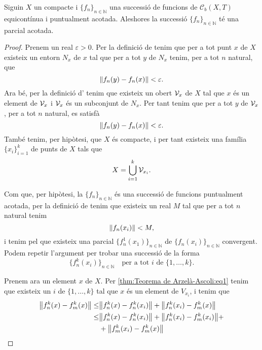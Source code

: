 \documentclass[../Apunts.tex]{subfiles}
\begin{document}
	\begin{theorem}
		\label{thm:Teorema de Arzelà-Ascoli}
		Siguin \(X\) un compacte i \(\{f_{n}\}_{n\in\mathbb{N}}\) una successió de funcions de \(\mathcal{C}_{b}(X,T)\) equicontínua i puntualment acotada. Aleshores la successió \(\{f_{n}\}_{n\in\mathbb{N}}\) té una parcial acotada.
		\begin{proof}
			Prenem un real \(\varepsilon>0\). Per la definició de  tenim que per a tot punt \(x\) de \(X\) existeix un entorn \(N_{x}\) de \(x\) tal que per a tot \(y\) de \(N_{x}\) tenim, per a tot \(n\) natural, que
			\[\norm{f_{n}(y)-f_{n}(x)}<\varepsilon.\]
			Ara bé, per la definició d' tenim que existeix un obert \(\mathcal{V}_{x}\) de \(X\) tal que \(x\) és un element de \(\mathcal{V}_{x}\) i \(\mathcal{V}_{x}\) és un subconjunt de \(N_{x}\). Per tant tenim que per a tot \(y\) de \(\mathcal{V}_{x}\), per a tot \(n\) natural, es satisfà
			\[\norm{f_{n}(y)-f_{n}(x)}<\varepsilon.\]
			També tenim, per hipòtesi, que \(X\) és compacte, i per tant existeix una família \(\{x_{i}\}_{i=1}^{k}\) de punts de \(X\) tals que
			\begin{equation}
				\label{thm:Teorema de Arzelà-Ascoli:eq1}
				X=\bigcup_{i=1}^{k}\mathcal{V}_{x_{i}}.
			\end{equation}
			
			Com que, per hipòtesi, la \(\{f_{n}\}_{n\in\mathbb{N}}\) és una successió de funcions puntualment acotada, per la definició de  tenim que existeix un real \(M\) tal que per a tot \(n\) natural tenim
			\[\norm{f_{n}(x_{i})}<M,\]
			i tenim pel  que existeix una parcial \(\{f_{n}^{1}(x_{1})\}_{n\in\mathbb{N}}\) de \(\{f_{n}(x_{i})\}_{n\in\mathbb{N}}\) convergent. Podem repetir l'argument per trobar una successió de la forma
			\[\{f^{k}_{n}(x_{i})\}_{n\in\mathbb{N}}\quad\text{per a tot }i\text{ de }\{1,\dots,k\}.\]
			
			Prenem ara un element \(x\) de \(X\). Per \eqref{thm:Teorema de Arzelà-Ascoli:eq1} tenim que existeix un \(i\) de \(\{1,\dots,k\}\) tal que \(x\) és un element de \(V_{x_{i}}\), i tenim que
			\begin{align*}
				\norm{f^{k}_{n}(x)-f^{k}_{m}(x)}\leq&\norm{f^{k}_{n}(x)-f^{k}_{n}(x_{i})}+\norm{f^{k}_{n}(x_{i})-f^{k}_{m}(x)} \\
				\leq&\norm{f^{k}_{n}(x)-f^{k}_{n}(x_{i})}+\norm{f^{k}_{n}(x_{i})-f^{k}_{m}(x_{i})}+\\&+\norm{f^{k}_{m}(x_{i})-f^{k}_{m}(x)}
			\end{align*}
			
		\end{proof}
	\end{theorem}
\end{document}
